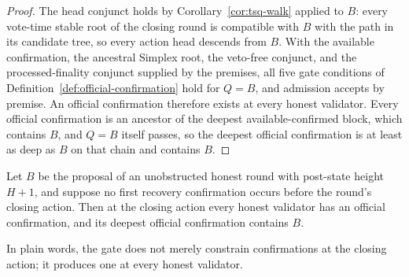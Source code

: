 \begin{proof}
The head conjunct holds by Corollary~\ref{cor:tsq-walk} applied to
\(B\): every vote-time stable root of the closing round is compatible
with \(B\) with the path in its candidate tree, so every action head
descends from \(B\).  With the available confirmation, the ancestral
Simplex root, the veto-free conjunct, and the processed-finality
conjunct supplied by the premises, all five gate conditions of
Definition~\ref{def:official-confirmation} hold for \(Q=B\), and
admission accepts by premise.  An official confirmation therefore exists
at every honest validator.  Every official confirmation is an ancestor
of the deepest available-confirmed block, which contains \(B\), and
\(Q=B\) itself passes, so the deepest official confirmation is at
least as deep as \(B\) on that chain and contains \(B\).
\end{proof}

\begin{lemma}
\label{lem:closing-action-existence}
Let \(B\) be the proposal of an unobstructed honest round with post-state
height \(H+1\), and suppose no first recovery confirmation occurs before
the round's closing action.  Then at the closing action every honest
validator has an official confirmation, and its deepest official
confirmation contains \(B\).

In plain words, the gate does not merely constrain confirmations at the
closing action; it produces one at every honest validator.
\end{lemma}

